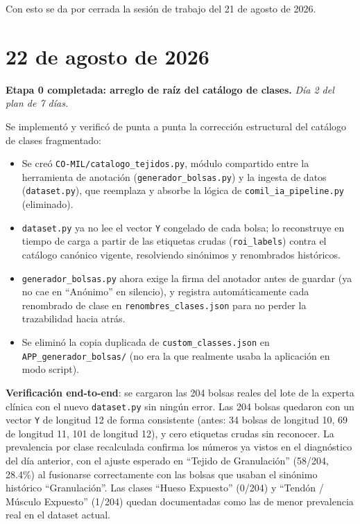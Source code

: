 \documentclass[12pt,letterpaper]{report}
\newcommand{\entrada}[2]{%
    \vspace{0.6em}
    \noindent\textbf{#1.} \textit{#2}
    \vspace{0.3em}
    \par
}
\begin{document}
Con esto se da por cerrada la sesión de trabajo del 21 de agosto de 2026.

\section{22 de agosto de 2026}

\entrada{Etapa 0 completada: arreglo de raíz del catálogo de clases}{Día 2 del plan de 7 días.}

Se implementó y verificó de punta a punta la corrección estructural del catálogo de clases
fragmentado:

\begin{itemize}[leftmargin=1.5em]
    \item Se creó \texttt{CO-MIL/catalogo\_tejidos.py}, módulo compartido entre la herramienta de
        anotación (\texttt{generador\_bolsas.py}) y la ingesta de datos (\texttt{dataset.py}), que
        reemplaza y absorbe la lógica de \texttt{comil\_ia\_pipeline.py} (eliminado).
    \item \texttt{dataset.py} ya no lee el vector \texttt{Y} congelado de cada bolsa; lo reconstruye
        en tiempo de carga a partir de las etiquetas crudas (\texttt{roi\_labels}) contra el
        catálogo canónico vigente, resolviendo sinónimos y renombrados históricos.
    \item \texttt{generador\_bolsas.py} ahora exige la firma del anotador antes de guardar (ya no
        cae en ``Anónimo'' en silencio), y registra automáticamente cada renombrado de clase en
        \texttt{renombres\_clases.json} para no perder la trazabilidad hacia atrás.
    \item Se eliminó la copia duplicada de \texttt{custom\_classes.json} en
        \texttt{APP\_generador\_bolsas/} (no era la que realmente usaba la aplicación en modo
        script).
\end{itemize}

\textbf{Verificación end-to-end}: se cargaron las 204 bolsas reales del lote de la experta clínica
con el nuevo \texttt{dataset.py} sin ningún error. Las 204 bolsas quedaron con un vector \texttt{Y}
de longitud 12 de forma consistente (antes: 34 bolsas de longitud 10, 69 de longitud 11, 101 de
longitud 12), y cero etiquetas crudas sin reconocer. La prevalencia por clase recalculada confirma
los números ya vistos en el diagnóstico del día anterior, con el ajuste esperado en ``Tejido de
Granulación'' (58/204, 28.4\%) al fusionarse correctamente con las bolsas que usaban el sinónimo
histórico ``Granulación''. Las clases ``Hueso Expuesto'' (0/204) y ``Tendón / Músculo Expuesto''
(1/204) quedan documentadas como las de menor prevalencia real en el dataset actual.
\end{document}
